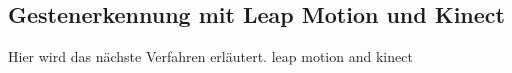 \subsection{Gestenerkennung mit Leap Motion und Kinect}
Hier wird das nächste Verfahren erl\"autert. leap motion and kinect
